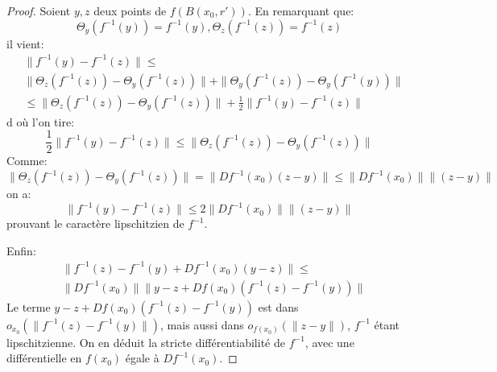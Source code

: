 \begin{proof}
Soient $y,z$ deux points de $f(B(x_0,r\prime))$. En remarquant que:
\[
\Theta_y(f^{-1}(y))=f^{-1}(y), \Theta_z(f^{-1}(z))=f^{-1}(z)
\]
il vient:
\begin{align*}
& \|f^{-1}(y) - f^{-1}(z) \| \leq \\ &
\| \Theta_z(f^{-1}(z)) -\Theta_y(f^{-1}(z)) \| + \| \Theta_y(f^{-1}(z))-\Theta_y(f^{-1}(y)) \| \\
& \leq  \| \Theta_z(f^{-1}(z)) -\Theta_y(f^{-1}(z)) \|  + \frac{1}{2} \|f^{-1}(y) - f^{-1}(z) \|
\end{align*}
d où l'on tire:
\[
\frac{1}{2} \|f^{-1}(y) - f^{-1}(z) \| \leq  \| \Theta_z(f^{-1}(z)) -\Theta_y(f^{-1}(z)) \| 
\]
Comme:
\[
\| \Theta_z(f^{-1}(z)) -\Theta_y(f^{-1}(z)) \|  = \| Df^{-1}(x_0) (z-y) \| \leq \| Df^{-1}(x_0)\| \|(z-y) \| 
\]
on a:
\[
\|f^{-1}(y) - f^{-1}(z) \| \leq  2 \| Df^{-1}(x_0)\| \|(z-y) \| 
\]
prouvant le caractère lipschitzien de $f^{-1}$.

Enfin:
\begin{align*}
& \|f^{-1}(z)-f^{-1}(y) +Df^{-1}(x_0)(y-z)\| \leq \\
& \| Df^{-1}(x_0)\| \| y-z+Df(x_0)\left(
f^{-1}(z) - f^{-1}(y)\right) \|
\end{align*}
Le terme $y-z+Df(x_0)\left(f^{-1}(z) - f^{-1}(y)\right)$ est dans $o_{x_0}(\|f^{-1}(z)-f^{-1}(y)\|)$, mais aussi 
dans $o_{f(x_0)}(\|z-y\|)$, $f^{-1}$ étant lipschitzienne. On en déduit la stricte différentiabilité de $f^{-1}$, avec une différentielle en $f(x_0)$ égale à $Df^{-1}(x_0)$.
\end{proof}


